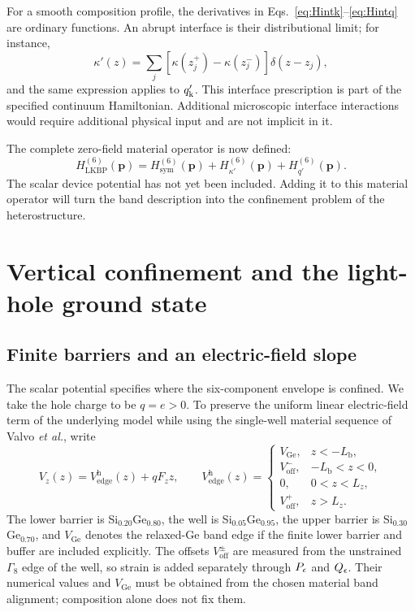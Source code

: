 For a smooth composition profile, the derivatives in Eqs.~\eqref{eq:Hintk}--\eqref{eq:Hintq} are ordinary functions. An abrupt interface is their distributional limit; for instance,
\begin{equation}
\kappa'(z)=\sum_j[\kappa(z_j^+)-\kappa(z_j^-)]\delta(z-z_j),
\label{eq:steps}
\end{equation}
and the same expression applies to $q_{\mathrm k}'$. This interface prescription is part of the specified continuum Hamiltonian. Additional microscopic interface interactions would require additional physical input and are not implicit in it.

The complete zero-field material operator is now defined:
\begin{equation}
H_{\mathrm{LKBP}}^{(6)}(\bm p)
=H_{\mathrm{sym}}^{(6)}(\bm p)
+H_{\kappa'}^{(6)}(\bm p)+H_{q'}^{(6)}(\bm p).
\label{eq:HLKBP}
\end{equation}
The scalar device potential has not yet been included. Adding it to this material operator will turn the band description into the confinement problem of the heterostructure.

\section{Vertical confinement and the light-hole ground state}
\label{sec:vertical}

\subsection{Finite barriers and an electric-field slope}

The scalar potential specifies where the six-component envelope is confined. We take the hole charge to be $q=e>0$. To preserve the uniform linear electric-field term of the underlying model while using the single-well material sequence of Valvo \emph{et al.}, write
\begin{equation}
V_z(z)=V_{\mathrm{edge}}^{\mathrm h}(z)+qF_z z,
\qquad
V_{\mathrm{edge}}^{\mathrm h}(z)=
\begin{cases}
V_{\mathrm{Ge}},&z<-L_{\mathrm b},\\[2pt]
V_{\mathrm{off}}^-,&-L_{\mathrm b}<z<0,\\[2pt]
0,&0<z<L_z,\\[2pt]
V_{\mathrm{off}}^+,&z>L_z.
\end{cases}
\label{eq:Vz}
\end{equation}
The lower barrier is Si$_{0.20}$Ge$_{0.80}$, the well is Si$_{0.05}$Ge$_{0.95}$, the upper barrier is Si$_{0.30}$Ge$_{0.70}$, and $V_{\mathrm{Ge}}$ denotes the relaxed-Ge band edge if the finite lower barrier and buffer are included explicitly. The offsets $V_{\mathrm{off}}^{\pm}$ are measured from the unstrained $\Gamma_8$ edge of the well, so strain is added separately through $P_\epsilon$ and $Q_\epsilon$. Their numerical values and $V_{\mathrm{Ge}}$ must be obtained from the chosen material band alignment; composition alone does not fix them.

